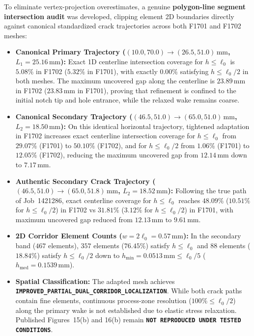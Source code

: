 To eliminate vertex-projection overestimates, a genuine \textbf{polygon-line segment intersection audit} was developed, clipping element 2D boundaries directly against canonical standardized crack trajectories across both F1701 and F1702 meshes:
\begin{itemize}
  \item \textbf{Canonical Primary Trajectory ($(10.0, 70.0) \to (26.5, 51.0)\,\mathrm{mm}$, $L_1 = 25.16\,\mathrm{mm}$):} Exact 1D centerline intersection coverage for $h \le \ell_0$ is $5.08\%$ in F1702 ($5.32\%$ in F1701), with exactly $0.00\%$ satisfying $h \le \ell_0/2$ in both meshes. The maximum uncovered gap along the centerline is $23.89\,\mathrm{mm}$ in F1702 ($23.83\,\mathrm{mm}$ in F1701), proving that refinement is confined to the initial notch tip and hole entrance, while the relaxed wake remains coarse.
  \item \textbf{Canonical Secondary Trajectory ($(46.5, 51.0) \to (65.0, 51.0)\,\mathrm{mm}$, $L_2 = 18.50\,\mathrm{mm}$):} On this identical horizontal trajectory, tightened adaptation in F1702 increases exact centerline intersection coverage for $h \le \ell_0$ from $29.07\%$ (F1701) to $50.10\%$ (F1702), and for $h \le \ell_0/2$ from $1.06\%$ (F1701) to $12.05\%$ (F1702), reducing the maximum uncovered gap from $12.14\,\mathrm{mm}$ down to $7.17\,\mathrm{mm}$.
  \item \textbf{Authentic Secondary Crack Trajectory ($(46.5, 51.0) \to (65.0, 51.8)\,\mathrm{mm}$, $L_2 = 18.52\,\mathrm{mm}$):} Following the true path of Job~1421286, exact centerline coverage for $h \le \ell_0$ reaches $48.09\%$ ($10.51\%$ for $h \le \ell_0/2$) in F1702 vs $31.81\%$ ($3.12\%$ for $h \le \ell_0/2$) in F1701, with maximum uncovered gap reduced from $12.13\,\mathrm{mm}$ to $9.61\,\mathrm{mm}$.
  \item \textbf{2D Corridor Element Counts ($w = 2\ell_0 = 0.57\,\mathrm{mm}$):} In the secondary band ($467$ elements), $357$ elements ($76.45\%$) satisfy $h \le \ell_0$ and $88$ elements ($18.84\%$) satisfy $h \le \ell_0/2$ down to $h_{\min} = 0.0513\,\mathrm{mm} \le \ell_0/5$ ($h_{\mathrm{med}} = 0.1539\,\mathrm{mm}$).
  \item \textbf{Spatial Classification:} The adapted mesh achieves \textbf{\texttt{IMPROVED\_PARTIAL\_DUAL\_CORRIDOR\_LOCALIZATION}}. While both crack paths contain fine elements, continuous process-zone resolution ($100\% \le \ell_0/2$) along the primary wake is not established due to elastic stress relaxation. Published Figures~15(b) and 16(b) remain \textbf{\texttt{NOT REPRODUCED UNDER TESTED CONDITIONS}}.
\end{itemize}

